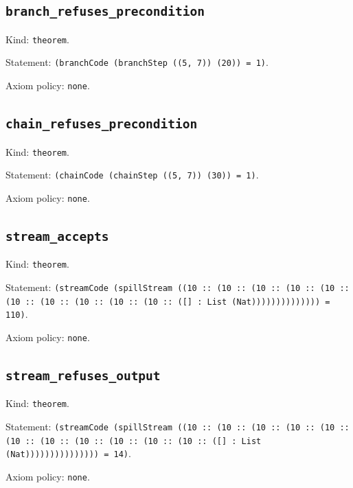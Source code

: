 \documentclass[11pt]{article}
\begin{document}
\subsection*{\texttt{branch\_refuses\_precondition}}
\noindent Kind: \texttt{theorem}.\par
\noindent Statement: \texttt{(branchCode (branchStep ((5, 7)) (20)) = 1)}.\par
\noindent Axiom policy: \texttt{none}.\par
\subsection*{\texttt{chain\_refuses\_precondition}}
\noindent Kind: \texttt{theorem}.\par
\noindent Statement: \texttt{(chainCode (chainStep ((5, 7)) (30)) = 1)}.\par
\noindent Axiom policy: \texttt{none}.\par
\subsection*{\texttt{stream\_accepts}}
\noindent Kind: \texttt{theorem}.\par
\noindent Statement: \texttt{(streamCode (spillStream ((10 :: (10 :: (10 :: (10 :: (10 :: (10 :: (10 :: (10 :: (10 :: (10 :: ([] : List (Nat)))))))))))))) = 110)}.\par
\noindent Axiom policy: \texttt{none}.\par
\subsection*{\texttt{stream\_refuses\_output}}
\noindent Kind: \texttt{theorem}.\par
\noindent Statement: \texttt{(streamCode (spillStream ((10 :: (10 :: (10 :: (10 :: (10 :: (10 :: (10 :: (10 :: (10 :: (10 :: (10 :: ([] : List (Nat))))))))))))))) = 14)}.\par
\noindent Axiom policy: \texttt{none}.\par
\end{document}
